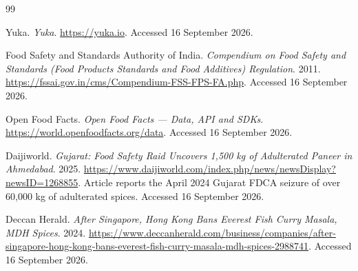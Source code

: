 \documentclass{report}
\begin{document}

\begin{thebibliography}{99}

Yuka. \textit{Yuka}. \url{https://yuka.io}. Accessed 16 September 2026.

Food Safety and Standards Authority of India. \textit{Compendium on Food
Safety and Standards (Food Products Standards and Food Additives)
Regulation}. 2011. \url{https://fssai.gov.in/cms/Compendium-FSS-FPS-FA.php}.
Accessed 16 September 2026.

Open Food Facts. \textit{Open Food Facts --- Data, API and SDKs}.
\url{https://world.openfoodfacts.org/data}. Accessed 16 September 2026.

Daijiworld. \textit{Gujarat: Food Safety Raid Uncovers 1,500 kg of
Adulterated Paneer in Ahmedabad}. 2025.
\url{https://www.daijiworld.com/index.php/news/newsDisplay?newsID=1268855}.
Article reports the April 2024 Gujarat FDCA seizure of over 60,000 kg of
adulterated spices. Accessed 16 September 2026.

Deccan Herald. \textit{After Singapore, Hong Kong Bans Everest Fish Curry
Masala, MDH Spices}. 2024.
\url{https://www.deccanherald.com/business/companies/after-singapore-hong-kong-bans-everest-fish-curry-masala-mdh-spices-2988741}.
Accessed 16 September 2026.

\end{thebibliography}
\end{document}
